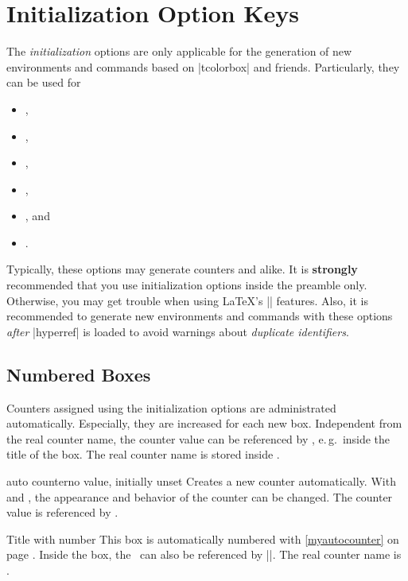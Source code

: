 \clearpage
\section{Initialization Option Keys}\label{sec:initkeys}%
%
The \emph{initialization} options are only applicable for the generation
of new environments and commands based on |tcolorbox| and friends.
Particularly, they can be used for
\begin{itemize}
\item{},
\item{},
\item{},
\item{},
\item{}, and
\item{}.
\end{itemize}

\bigskip
\begin{marker}
Typically, these options may generate counters and alike.
It is \textbf{strongly} recommended that you use initialization options inside
the preamble only. Otherwise, you may get trouble when using \LaTeX's || features.
Also, it is recommended to generate new environments and commands with these
options \emph{after} |hyperref| is loaded to avoid warnings about
\emph{duplicate identifiers}.
\end{marker}


\subsection{Numbered Boxes}\label{sec:numberedboxes}
Counters assigned using the initialization options are administrated
automatically. Especially, they are increased for each new box.
Independent from the real counter name, the counter value can be
referenced by , e.\,g.\ inside the title of
the box. The real counter name is stored inside .

\begin{newTcbKey}{auto counter}{}{no value, initially unset}
Creates a new counter automatically.
With  and
, the appearance and behavior of the counter
can be changed. The counter value is referenced by .


\begin{dispExample}
\begin{pabox}[label={myautocounter}]{Title with number}
This box is automatically numbered with \ref{myautocounter} on page
\pageref{myautocounter}. Inside the box, the \thetcbcounter\ can
also be referenced by |\thetcbcounter|.
The real counter name is \texttt{\tcbcounter}.
\end{pabox}
\end{dispExample}
\end{newTcbKey}

